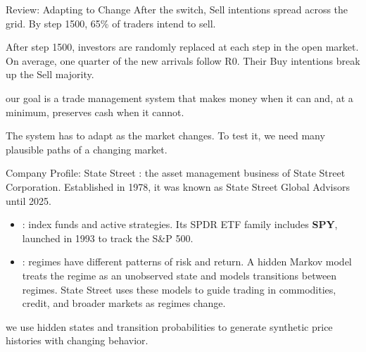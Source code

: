 \documentclass[aspectratio=169,11pt]{beamer}
\begin{document}
\begin{frame}{Review: Adapting to Change}
  After the switch, Sell intentions spread across the grid. By step 1500, 65\% of
  traders intend to sell.

  After step 1500, investors are randomly replaced at each step in the open market.
  On average, one quarter of the new arrivals follow R0. Their Buy intentions break
  up the Sell majority.

  \vspace{0.7em}
  \textbf{} our goal is a trade management system that makes money when it
  can and, at a minimum, preserves cash when it cannot.

  \vspace{0.7em}
  The system has to adapt as the market changes. To test it, we need many plausible
  paths of a changing market.
\end{frame}

\begin{frame}{Company Profile: State Street}
  \href{https://www.ssga.com/us/en/about-us}{}:
  the asset management business of State Street Corporation. Established in 1978,
  it was known as State Street Global Advisors until 2025.
  \begin{itemize}\setlength{\itemsep}{0.4em}
    \item {}: index funds and active strategies. Its SPDR
      ETF family includes \textbf{SPY}, launched in 1993 to track the S\&P 500.
    \item {}: regimes have different patterns of risk and return.
      A hidden Markov model treats the regime as an unobserved state and models
      transitions between regimes. State Street uses these models to guide trading
      in commodities, credit, and broader markets as regimes change.
  \end{itemize}
  \vspace{0.3em}
  \textbf{} we use hidden states and transition probabilities to
  generate synthetic price histories with changing behavior.
\end{frame}
\end{document}

